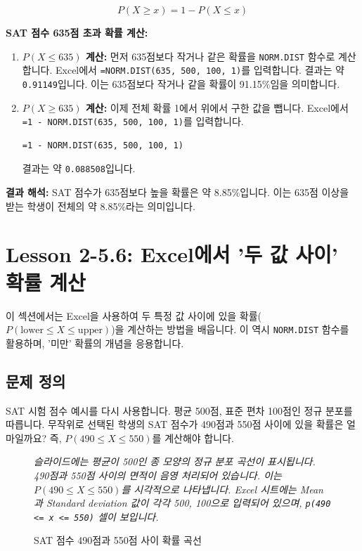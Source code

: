 \documentclass[11pt,a4paper]{article}
\theoremstyle{definition}
\newcommand{\newsection}[1]{\newpage\section{#1}}
\begin{document}
\begin{equation*}
    P(X \ge x) = 1 - P(X \le x)
\end{equation*}

\begin{examplebox}
    \textbf{SAT 점수 635점 초과 확률 계산:}
    \begin{enumerate}
        \item \textbf{$P(X \le 635)$ 계산:}
        먼저 635점보다 작거나 같은 확률을 \texttt{NORM.DIST} 함수로 계산합니다.
        Excel에서 \texttt{=NORM.DIST(635, 500, 100, 1)}를 입력합니다.
        결과는 약 \texttt{0.91149}입니다.
        이는 635점보다 작거나 같을 확률이 91.15\%임을 의미합니다.

        \item \textbf{$P(X \ge 635)$ 계산:}
        이제 전체 확률 1에서 위에서 구한 값을 뺍니다.
        Excel에서 \texttt{=1 - NORM.DIST(635, 500, 100, 1)}를 입력합니다.
        \begin{lstlisting}[language=Excel, caption={Excel에서 '초과' 확률 계산 예시}, label={lst:norm_dist_greater_than}]
=1 - NORM.DIST(635, 500, 100, 1)
        \end{lstlisting}
        결과는 약 \texttt{0.088508}입니다.
    \end{enumerate}

    \textbf{결과 해석:}
    SAT 점수가 635점보다 높을 확률은 약 8.85\%입니다.
    이는 635점 이상을 받는 학생이 전체의 약 8.85\%라는 의미입니다.
\end{examplebox}

\newsection{Lesson 2-5.6: Excel에서 '두 값 사이' 확률 계산}

이 섹션에서는 Excel을 사용하여 두 특정 값 사이에 있을 확률($P(\text{lower} \le X \le \text{upper})$)을 계산하는 방법을 배웁니다.
이 역시 \texttt{NORM.DIST} 함수를 활용하며, '미만' 확률의 개념을 응용합니다.

\subsection{문제 정의}
SAT 시험 점수 예시를 다시 사용합니다. 평균 500점, 표준 편차 100점인 정규 분포를 따릅니다.
무작위로 선택된 학생의 SAT 점수가 490점과 550점 사이에 있을 확률은 얼마일까요?
즉, $P(490 \le X \le 550)$를 계산해야 합니다.

\begin{figure}[h!]
    \centering
    \caption{SAT 점수 490점과 550점 사이 확률 곡선}
    \label{fig:sat_between_values}
    \vspace{0.5em}
    \textit{슬라이드에는 평균이 500인 종 모양의 정규 분포 곡선이 표시됩니다. 490점과 550점 사이의 면적이 음영 처리되어 있습니다. 이는 $P(490 \le X \le 550)$를 시각적으로 나타냅니다. Excel 시트에는 Mean과 Standard deviation 값이 각각 500, 100으로 입력되어 있으며, \texttt{p(490 <= x <= 550)} 셀이 보입니다.}
\end{figure}
\end{document}
